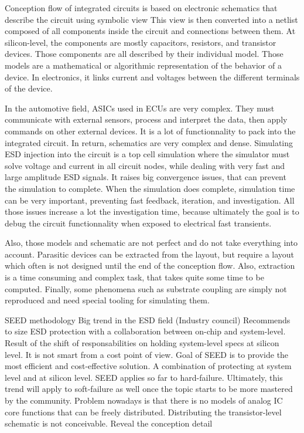 Conception flow of integrated circuits is based on electronic schematics that describe the circuit using symbolic view
This view is then converted into a netlist composed of all components inside the circuit and connections between them.
At silicon-level, the components are mostly capacitors, resistors, and transistor devices.
Those components are all described by their individual model.
Those models are a mathematical or algorithmic representation of the behavior of a device.
In electronics, it links current and voltages between the different terminals of the device.

In the automotive field, ASICs used in ECUs are very complex.
They must communicate with external sensors, process and interpret the data, then apply commands on other external devices.
It is a lot of functionnality to pack into the integrated circuit.
In return, schematics are very complex and dense.
Simulating ESD injection into the circuit is a top cell simulation where the simulator must solve voltage and current in all circuit nodes, while dealing with very fast and large amplitude ESD signals.
It raises big convergence issues, that can prevent the simulation to complete.
When the simulation does complete, simulation time can be very important, preventing fast feedback, iteration, and investigation.
All those issues increase a lot the investigation time, because ultimately the goal is to debug the circuit functionnality when exposed to electrical fast transients.

Also, those models and schematic are not perfect and do not take everything into account.
Parasitic devices can be extracted from the layout, but require a layout which often is not designed until the end of the conception flow.
Also, extraction is a time consuming and complex task, that takes quite some time to be computed.
Finally, some phenomena such as substrate coupling are simply not reproduced and need special tooling for simulating them.

SEED methodology
Big trend in the ESD field (Industry council)
Recommends to size ESD protection with a collaboration between on-chip and system-level.
Result of the shift of responsabilities on holding system-level specs at silicon level.
It is not smart from a cost point of view.
Goal of SEED is to provide the most efficient and cost-effective solution.
A combination of protecting at system level and at silicon level.
SEED applies so far to hard-failure.
Ultimately, this trend will apply to soft-failure as well once the topic starts to be more mastered by the community.
Problem nowadays is that there is no models of analog IC core functions that can be freely distributed.
Distributing the transistor-level schematic is not conceivable.
Reveal the conception detail

